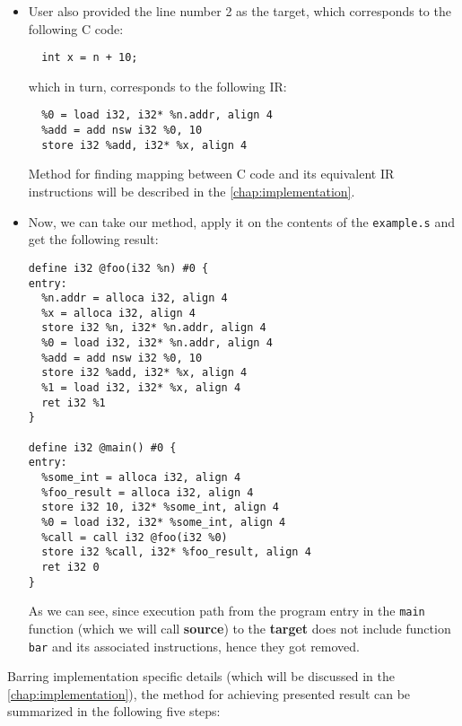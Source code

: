 \documentclass[12pt, twoside]{fithesis2}
\renewcommand{\_}{\leavevmode \kern0.07em\vbox{\hrule width0.4em}}
\newcommand{\squarebullet}{\textcolor{black}{\raisebox{0.15em}{\rule{4pt}{4pt}}}}
\newenvironment{myItemize}{
  \begin{itemize}[
    leftmargin=2em,
    rightmargin=1em,
    itemsep=\parskip,
    parsep=0em,
    topsep=0em,
    partopsep=0em
]
  \renewcommand{\labelitemi}{\squarebullet}
  \renewcommand{\labelitemii}{\textbullet}
}{
  \end{itemize}
}
\begin{document}
\begin{myItemize}
\item User also provided the line number 2 as the target, which corresponds to
the following C code:

\begin{verbatim}
  int x = n + 10;
\end{verbatim}

which in turn, corresponds to the following IR:

\begin{verbatim}
  %0 = load i32, i32* %n.addr, align 4
  %add = add nsw i32 %0, 10
  store i32 %add, i32* %x, align 4
\end{verbatim}

Method for finding mapping between C code and its equivalent IR instructions
will be described in the \autoref{chap:implementation}.
\end{myItemize}

\begin{myItemize}
\item Now, we can take our method, apply it on the contents of the
\texttt{example.s} and get the following result:

\begin{verbatim}
define i32 @foo(i32 %n) #0 {
entry:
  %n.addr = alloca i32, align 4
  %x = alloca i32, align 4
  store i32 %n, i32* %n.addr, align 4
  %0 = load i32, i32* %n.addr, align 4
  %add = add nsw i32 %0, 10
  store i32 %add, i32* %x, align 4
  %1 = load i32, i32* %x, align 4
  ret i32 %1
}

define i32 @main() #0 {
entry:
  %some_int = alloca i32, align 4
  %foo_result = alloca i32, align 4
  store i32 10, i32* %some_int, align 4
  %0 = load i32, i32* %some_int, align 4
  %call = call i32 @foo(i32 %0)
  store i32 %call, i32* %foo_result, align 4
  ret i32 0
}
\end{verbatim}

As we can see, since execution path from the program entry in the
\texttt{main} function (which we will call \textbf{source}) to the
\textbf{target} does not include function \texttt{bar} and its
associated instructions, hence they got removed.
\end{myItemize}


\bigskip
Barring implementation specific details (which will be discussed in the
\autoref{chap:implementation}), the method for achieving presented result can be
summarized in the following five steps:
\end{document}
